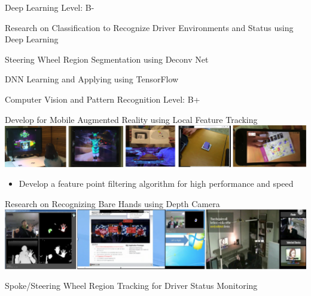 


\begin{cventries}
  \cventry
    {Deep Learning} %
    {} %
    {} %
    {Level: B-} %
    {
      \begin{cvitems} %
        \item {Research on Classification to Recognize Driver Environments and Status using Deep Learning}
        \item {Steering Wheel Region Segmentation using Deconv Net}
        \item {DNN Learning and Applying using TensorFlow}
      \end{cvitems}
    }

  \cventry
    {Computer Vision and Pattern Recognition} %
    {} %
    {} %
    {Level: B+} %
    {
      \begin{cvitems} %
        \item {Develop for Mobile Augmented Reality using Local Feature Tracking \\
               \includegraphics[width=\linewidth]{cv/resources/ar.png} }
          \begin{itemize}
            \item {Develop a feature point filtering algorithm for high performance and speed}
          \end{itemize}
        \item {Research on Recognizing Bare Hands using Depth Camera \\
               \includegraphics[width=\linewidth]{cv/resources/hand.png} }
        \item {Spoke/Steering Wheel Region Tracking for Driver Status Monitoring}
      \end{cvitems}
    }


\end{cventries}

